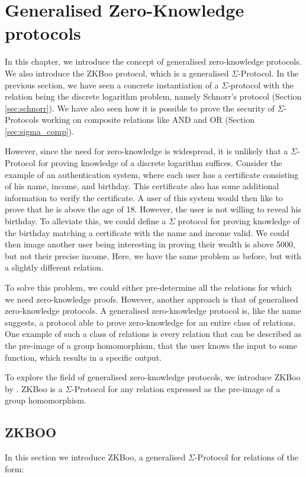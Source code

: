 \chapter{Generalised Zero-Knowledge protocols}
\label{ch:general_zk}
In this chapter, we introduce the concept of generalised zero-knowledge
protocols. We also introduce the ZKBoo protocol, which is a generalised $\Sigma$-Protocol.
In the previous section, we have seen a concrete instantiation of a
$\Sigma$-protocol with the relation being the discrete logarithm problem, namely
Schnorr's protocol (Section \ref{sec:schnorr}).
We have also seen how it is possible to prove the security of $\Sigma$-Protocols
working on composite relations like AND and OR (Section \ref{sec:sigma_comp}).

However, since the need for zero-knowledge is widespread, it is unlikely that a
$\Sigma$-Protocol for proving knowledge of a discrete logarithm suffices.
Consider the example of an authentication system, where each user has a
certificate consisting of his name, income, and birthday. This certificate also has some
additional information to verify the certificate.
A user of this system would then like to prove that he is above the age of 18.
However, the user is not willing to reveal his birthday. To alleviate this,
we could define a $\Sigma$ protocol for proving knowledge of the birthday matching
a certificate with the name and income valid.
We could then image another user being interesting in proving their wealth is
above 5000, but not their precise income. Here, we have the same problem as
before, but with a slightly different relation.

To solve this problem, we could either pre-determine all the relations for which
we need zero-knowledge proofs. However, another approach is that of generalised
zero-knowledge protocols.
A generalised zero-knowledge protocol is, like the name suggests, a
protocol able to prove zero-knowledge for an entire class of relations.
One example of such a class of relations is every relation that can be
described as the pre-image of a group homomorphism, \ie that the user knows the
input to some function, which results in a specific output.

To explore the field of generalised zero-knowledge protocols, we introduce ZKBoo
by \citet{zkboo}.
ZKBoo is a $\Sigma$-Protocol for any relation expressed as the
pre-image of a group homomorphism.
\section{ZKBOO}
\label{sec:zkboo}
In this section we introduce ZKBoo, a generalised $\Sigma$-Protocol for
relations of the form:

